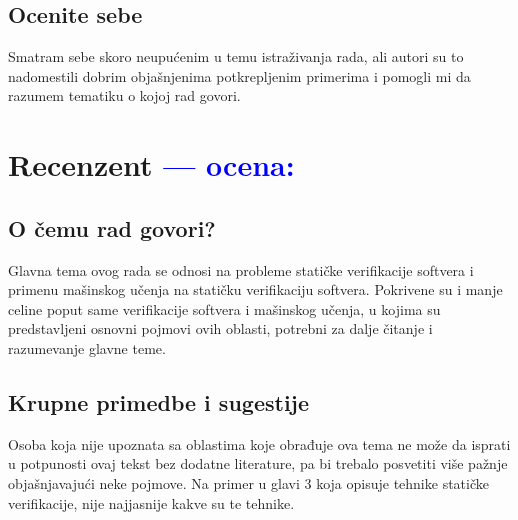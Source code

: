 \documentclass[a4paper]{report}
\newcommand{\odgovor}[1]{\textcolor{blue}{#1}}
\begin{document}
\section{Ocenite sebe}
Smatram sebe skoro neupućenim u temu istraživanja rada, ali autori su to nadomestili dobrim objašnjenima potkrepljenim primerima i pomogli mi da razumem tematiku o kojoj rad govori.

\chapter{Recenzent \odgovor{--- ocena:} }


\section{O čemu rad govori?}
Glavna tema ovog rada se odnosi na probleme statičke verifikacije softvera i primenu mašinskog učenja na statičku verifikaciju softvera. Pokrivene su i manje celine poput same verifikacije softvera i mašinskog učenja, u kojima su predstavljeni osnovni pojmovi ovih oblasti, potrebni za dalje čitanje i razumevanje glavne teme.

\section{Krupne primedbe i sugestije}
Osoba koja nije upoznata sa oblastima koje obrađuje ova tema ne može da isprati u potpunosti ovaj tekst bez dodatne literature, pa bi trebalo posvetiti više pažnje objašnjavajući neke pojmove. Na primer u glavi 3 koja opisuje tehnike statičke verifikacije, nije najjasnije kakve su te tehnike.
\end{document}
